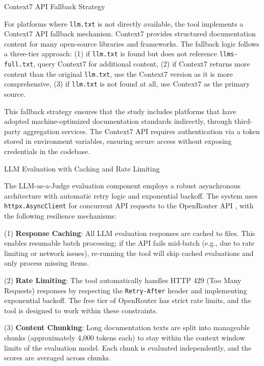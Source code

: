 \documentclass[10pt,conference,a4paper]{IEEEtran}
\makeatletter
\let\oldsubsubsection\subsubsection
\renewcommand{\subsubsection}{%
    \@ifstar{\subsubsectionStar}{\subsubsectionNoStar}%
}
\newcommand{\subsubsectionStar}[1]{%
    \oldsubsubsection*{\textit{#1}}%
}
\newcommand{\subsubsectionNoStar}[1]{%
    \oldsubsubsection{\textit{#1}}%
}
\makeatother
\begin{document}
\subsubsection{Context7 API Fallback Strategy}

For platforms where \texttt{llm.txt} is not directly available, the tool implements a Context7 API fallback mechanism. Context7 provides structured documentation content for many open-source libraries and frameworks. The fallback logic follows a three-tier approach: (1) if \texttt{llm.txt} is found but does not reference \texttt{llms-full.txt}, query Context7 for additional content, (2) if Context7 returns more content than the original \texttt{llm.txt}, use the Context7 version as it is more comprehensive, (3) if \texttt{llm.txt} is not found at all, use Context7 as the primary source.

This fallback strategy ensures that the study includes platforms that have adopted machine-optimized documentation standards indirectly, through third-party aggregation services. The Context7 API requires authentication via a token stored in environment variables, ensuring secure access without exposing credentials in the codebase.

\subsubsection{LLM Evaluation with Caching and Rate Limiting}

The LLM-as-a-Judge evaluation component employs a robust asynchronous architecture with automatic retry logic and exponential backoff. The system uses \texttt{httpx.AsyncClient} for concurrent API requests to the OpenRouter API \cite{OpenRouter2024}, with the following resilience mechanisms:

(1) \textbf{Response Caching}: All LLM evaluation responses are cached to  files. This enables resumable batch processing; if the API fails mid-batch (e.g., due to rate limiting or network issues), re-running the tool will skip cached evaluations and only process missing items.

(2) \textbf{Rate Limiting}: The tool automatically handles HTTP 429 (Too Many Requests) responses by respecting the \texttt{Retry-After} header and implementing exponential backoff. The free tier of OpenRouter has strict rate limits, and the tool is designed to work within these constraints.

(3) \textbf{Content Chunking}: Long documentation texts are split into manageable chunks (approximately 4,000 tokens each) to stay within the context window limits of the evaluation model. Each chunk is evaluated independently, and the scores are averaged across chunks.
\end{document}
